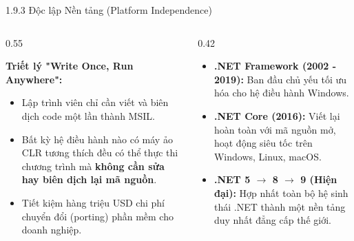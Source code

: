 \documentclass[aspectratio=169, 10pt]{beamer}
\begin{document}
\begin{frame}{1.9.3 Độc lập Nền tảng (Platform Independence)}
  \begin{columns}[c]
    \begin{column}{0.55\textwidth}
      \begin{block}{\textbf{Triết lý "Write Once, Run Anywhere":}}
        \begin{itemize}
          \item Lập trình viên chỉ cần viết và biên dịch code một lần thành MSIL.
          \item Bất kỳ hệ điều hành nào có máy ảo CLR tương thích đều có thể thực thi chương trình mà \textbf{không cần sửa hay biên dịch lại mã nguồn}.
          \item Tiết kiệm hàng triệu USD chi phí chuyển đổi (porting) phần mềm cho doanh nghiệp.
        \end{itemize}
      \end{block}
    \end{column}
    \begin{column}{0.42\textwidth}
      \begin{tcolorbox}[colback=UniLightBlue,colframe=UniBlue,title=\textbf{Sự tiến hóa của .NET}]
        \begin{itemize}\scriptsize
          \item \textbf{.NET Framework (2002 - 2019):} Ban đầu chủ yếu tối ưu hóa cho hệ điều hành Windows.
          \item \textbf{.NET Core (2016):} Viết lại hoàn toàn với mã nguồn mở, hoạt động siêu tốc trên Windows, Linux, macOS.
          \item \textbf{.NET 5 $\to$ 8 $\to$ 9 (Hiện đại):} Hợp nhất toàn bộ hệ sinh thái .NET thành một nền tảng duy nhất đẳng cấp thế giới.
        \end{itemize}
      \end{tcolorbox}
    \end{column}
  \end{columns}
\end{frame}
\end{document}

